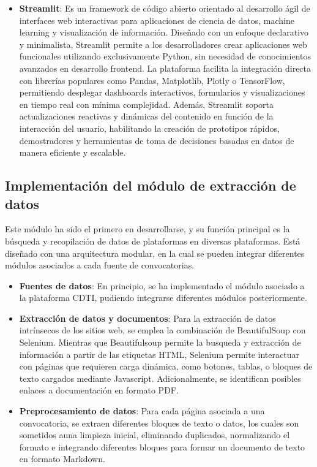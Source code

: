 \begin{itemize}
    \item \textbf{Streamlit}: Es un framework de código abierto orientado al desarrollo ágil de interfaces web interactivas para aplicaciones de ciencia de datos, machine learning y visualización de información. 
    Diseñado con un enfoque declarativo y minimalista, Streamlit permite a los desarrolladores crear aplicaciones web funcionales utilizando exclusivamente Python, sin necesidad de conocimientos avanzados en desarrollo frontend. 
    La plataforma facilita la integración directa con librerías populares como Pandas, Matplotlib, Plotly o TensorFlow, permitiendo desplegar dashboards interactivos, formularios y visualizaciones en tiempo real con mínima complejidad. 
    Además, Streamlit soporta actualizaciones reactivas y dinámicas del contenido en función de la interacción del usuario, habilitando la creación de prototipos rápidos, demostradores y herramientas de toma de decisiones basadas en datos de manera eficiente y escalable.
\end{itemize}



\subsection{Implementación del módulo de extracción de datos}

Este módulo ha sido el primero en desarrollarse, y su función principal es la búsqueda y recopilación de datos de plataformas en diversas plataformas.
Está diseñado con una arquitectura modular, en la cual se pueden integrar diferentes módulos asociados a cada fuente de convocatorias. 


\begin{itemize}
    \item \textbf{Fuentes de datos}: En principio, se ha implementado el módulo asociado a la plataforma CDTI, pudiendo integrarse diferentes módulos posteriormente.
    \item \textbf{Extracción de datos y documentos}: Para la extracción de datos intrínsecos de los sitios web, se emplea la combinación de BeautifulSoup con Selenium.
    Mientras que Beautifulsoup permite la busqueda y extracción de información a partir de las etiquetas HTML, Selenium permite interactuar con páginas que requieren carga dinámica, como botones, tablas, o bloques de texto cargados mediante Javascript.
    Adicionalmente, se identifican posibles enlaces a documentación en formato PDF.
    \item \textbf{Preprocesamiento de datos}: Para cada página asociada a una convocatoria, se extraen diferentes bloques de texto o datos, los cuales son sometidos  auna limpieza inicial, eliminando duplicados, normalizando el formato e integrando diferentes bloques para formar un documento de texto en formato Markdown.
\end{itemize}



